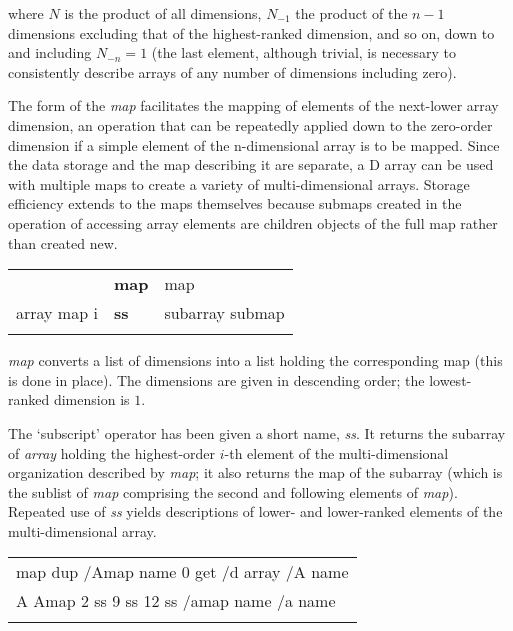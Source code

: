 \begin{equation}
[ N N_{-1} N_{-2} \ldots N_{-n} ]
\end{equation}

\noindent where $N$ is the product of all dimensions, $N_{-1}$ the product of the $n-1$ dimensions excluding that of the highest-ranked dimension, and so on, down to and including $N_{-n}=1$ (the last element, although trivial, is necessary to consistently describe arrays of any number of dimensions including zero).

The form of the \emph{map} facilitates the mapping of elements of the next-lower array dimension, an operation that can be repeatedly applied down to the zero-order dimension if a simple element of the n-dimensional array is to be mapped. Since the data storage and the map describing it are separate, a D array can be used with multiple maps to create a variety of multi-dimensional arrays. Storage efficiency extends to the maps themselves because submaps created in the operation of accessing array elements are children objects of the full map rather than created new.\\

 \begin{tabular}{>{\sffamily}r>{\sffamily\bfseries}l>{\sffamily}l}
[ dimensions ] & map & map\\
array map i & ss & subarray submap\\\\
\end{tabular}

\emph{map} converts a list of dimensions into a list holding the corresponding map (this is done in place). The dimensions are given in descending order; the lowest-ranked dimension is $1$.

The `subscript' operator has been given a short name, \emph{ss}. It returns the subarray of \emph{array} holding the highest-order $i$-th element of the multi-dimensional organization described by \emph{map}; it also returns the map of the subarray (which is the sublist of \emph{map} comprising the second and following elements of \emph{map}). Repeated use of \emph{ss} yields descriptions of lower- and lower-ranked elements of the multi-dimensional array.\\

\begin{tabular}{>{\sffamily}l}
[ 15 20 100 1 ] map dup /Amap name 0 get /d array /A name\\
A Amap 2 ss 9 ss 12 ss /amap name /a name\\\\
\end{tabular}

